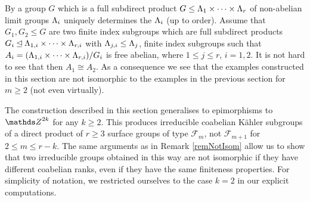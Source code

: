 \begin{remark}
\label{remNotIsom}
  By \cite[Theorem C(3)]{BriHowMilSho-13} a group $G$ which is a full subdirect product $G\leq \Lambda_1\times \dots \times \Lambda_r$ of non-abelian limit groups $\Lambda_i$ uniquely determines the $\Lambda_i$ (up to order). Assume that $G_1,G_2\leq G$ are two finite index subgroups which are full subdirect products $G_i\unlhd \Lambda_{1,i}\times \dots \times \Lambda_{r,i}$ with $\Lambda_{j,i}\leq \Lambda_j$, finite index subgroups such that $A_i=(\Lambda_{1,i}\times \dots \times \Lambda_{r,i})/G_i$ is free abelian, where $1\leq j\leq r$, $i=1,2$. It is not hard to see that then $A_1\cong A_2$. As a consequence we see that the examples constructed in this section are not isomorphic to the examples in the previous section for $m\geq 2$ (not even virtually).
\end{remark}




\begin{remark}
 The construction described in this section generalises to epimorphisms to $\ZZ^{2k}$ for any $k\geq 2$. This produces irreducible coabelian K\"ahler subgroups of a direct product of $r\geq 3$ surface groups of type $\mathcal{F}_m$, not $\mathcal{F}_{m+1}$ for $2\leq m \leq r-k$. The same arguments as in Remark \ref{remNotIsom} allow us to show that two irreducible groups obtained in this way are not isomorphic if they have different coabelian ranks, even if they have the same finiteness properties. For simplicity of notation, we restricted ourselves to the case $k=2$ in our explicit computations.
\end{remark}


